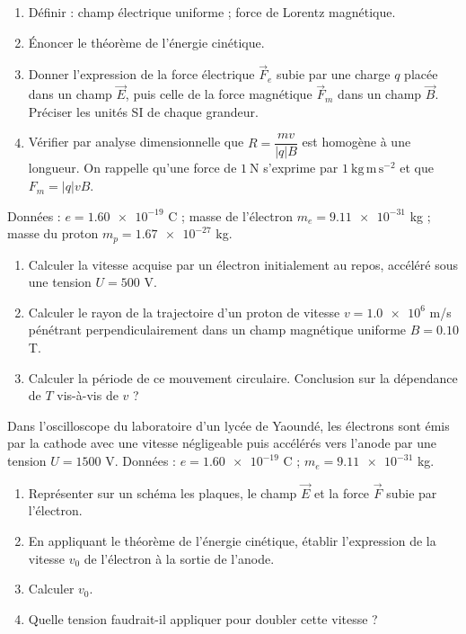 \documentclass[11pt]{article}
\newcounter{popsec}
\newcounter{popsub}
\newcommand{\courssub}[1]{%
  \stepcounter{popsub}%
  \par\vspace{9pt}\noindent{\popxbold\fontsize{11.5}{13}\selectfont\color{popink}{\color{poporange}\thepopsec.\thepopsub}\hspace{6pt}#1}\par\nopagebreak\vspace{4pt}
}
\begin{document}
\begin{exercice}
\begin{enumerate}
\item Définir : champ électrique uniforme ; force de Lorentz magnétique.
\item Énoncer le théorème de l'énergie cinétique.
\item Donner l'expression de la force électrique $\vec{F}_e$ subie par une charge $q$ placée dans un champ $\vec{E}$, puis celle de la force magnétique $\vec{F}_m$ dans un champ $\vec{B}$. Préciser les unités SI de chaque grandeur.
\item Vérifier par analyse dimensionnelle que $R = \dfrac{mv}{|q|B}$ est homogène à une longueur. On rappelle qu'une force de $1~\mathrm{N}$ s'exprime par $1~\mathrm{kg\,m\,s^{-2}}$ et que $F_m = |q|vB$.
\end{enumerate}
\end{exercice}

\begin{exercice}
Données : $e = \num{1,60e-19}$ C ; masse de l'électron $m_e = \num{9,11e-31}$ kg ; masse du proton $m_p = \num{1,67e-27}$ kg.
\begin{enumerate}
\item Calculer la vitesse acquise par un électron initialement au repos, accéléré sous une tension $U = 500$ V.
\item Calculer le rayon de la trajectoire d'un proton de vitesse $v = \num{1,0e6}$ m/s pénétrant perpendiculairement dans un champ magnétique uniforme $B = \num{0,10}$ T.
\item Calculer la période de ce mouvement circulaire. Conclusion sur la dépendance de $T$ vis-à-vis de $v$ ?
\end{enumerate}
\end{exercice}

\courssub{Je m'entraîne}

\begin{exercice}
Dans l'oscilloscope du laboratoire d'un lycée de Yaoundé, les électrons sont émis par la cathode avec une vitesse négligeable puis accélérés vers l'anode par une tension $U = 1500$ V.
Données : $e = \num{1,60e-19}$ C ; $m_e = \num{9,11e-31}$ kg.
\begin{enumerate}
\item Représenter sur un schéma les plaques, le champ $\vec{E}$ et la force $\vec{F}$ subie par l'électron.
\item En appliquant le théorème de l'énergie cinétique, établir l'expression de la vitesse $v_0$ de l'électron à la sortie de l'anode.
\item Calculer $v_0$.
\item Quelle tension faudrait-il appliquer pour doubler cette vitesse ?
\end{enumerate}
\end{exercice}
\end{document}

